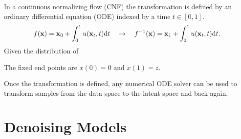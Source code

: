 In a continuous normalizing flow (CNF) the transformation is defined by an ordinary differential equation (ODE) indexed by a time $t \in [0, 1]$.
\begin{equation}
    f(\mathbf{x}) = \mathbf{x}_0 + \int_0^1 u(\mathbf{x}_t, t) \mathrm{d} t
    \quad \rightarrow \quad
    f^{-1}(\mathbf{x}) = \mathbf{x}_1 + \int_0^1 u(\mathbf{x}_t, t) \mathrm{d} t.
\end{equation}
Given the distribution of



The fixed end points are $x(0) = 0$ and $x(1) = z$.

Once the transformation is defined, any numerical ODE solver can be used to transform samples from the data space to the latent space and back again.





\section{Denoising Models}



